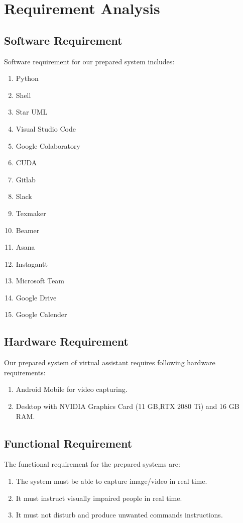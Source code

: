       \chapter{Requirement Analysis}
        \section{Software Requirement}
            Software requirement for our prepared system includes:
            \begin{enumerate}
                \item Python
                \item Shell
                \item Star UML
                \item Visual Studio Code
                \item Google Colaboratory
                \item CUDA
                \item Gitlab
	            \item Slack
                \item Texmaker
                \item Beamer
                \item Asana
                \item Instagantt
                \item Microsoft Team
                \item Google Drive
                \item Google Calender
            \end{enumerate}
         \section{Hardware Requirement}
            Our prepared system of virtual assistant requires following hardware requirements:
            \begin{enumerate}
                \item Android Mobile for video capturing.
                \item Desktop with NVIDIA Graphics Card (11 GB,RTX 2080 Ti)  and 16 GB RAM.
            \end{enumerate}
            
        \section{Functional Requirement}
            The functional requirement for the prepared systems are:
            \begin{enumerate}
                \item The system must be able to capture image/video in real time.
                \item It must instruct visually impaired people in real time.
                \item It must not disturb and produce unwanted commands instructions.
            \end{enumerate}

